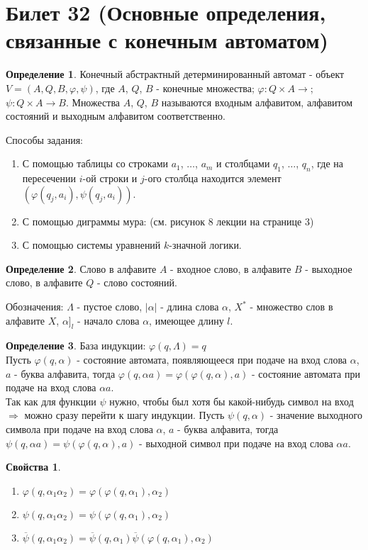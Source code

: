 \documentclass[a4paper, 12pt]{article}
\renewcommand{\phi}{\varphi}
\theoremstyle{definition}
\newtheorem*{definition}{Определение}
\theoremstyle{plain}
\newtheorem*{properties}{Свойства}
\theoremstyle{remark}
\begin{document}
  \section{Билет 32 (Основные определения, связанные с конечным автоматом)}
  \begin{definition}
    Конечный абстрактный детерминированный автомат - объект $V=(A,Q,B,\phi,\psi)$, где $A$, $Q$, $B$ - конечные множества; $\phi:Q\times A\rightarrow$; $\psi:Q\times A\rightarrow B$. Множества $A$, $Q$, $B$ называются входным алфавитом, алфавитом состояний и выходным алфавитом соответственно.
  \end{definition}
  Способы задания:\\
  \begin{enumerate}
    \item С помощью таблицы со строками $a_1$, $\ldots$, $a_m$ и столбцами $q_1$, $\ldots$, $q_n$, где на пересечении $i$-ой строки и $j$-ого столбца находится элемент $(\phi(q_j, a_i), \psi(q_j, a_i))$.
    \item С помощью диграммы мура: (см. рисунок 8 лекции на странице 3)
    \item С помощью системы уравнений $k$-значной логики.
  \end{enumerate}
  \begin{definition}
    Слово в алфавите $A$ - входное слово, в алфавите $B$ - выходное слово, в алфавите $Q$ - слово состояний.
  \end{definition}
  Обозначения: $\Lambda$ - пустое слово, $|\alpha|$ - длина слова $\alpha$, $X^*$ - множество слов в алфавите $X$, $\alpha]_l$ - начало слова $\alpha$, имеющее длину $l$.
  \begin{definition}
    База индукции: $\phi(q, \Lambda)=q$\\
    Пусть $\phi(q,\alpha)$ - состояние автомата, появляющееся при подаче на вход слова $\alpha$, $a$ - буква алфавита, тогда $\phi(q, \alpha a)=\phi(\phi(q,\alpha),a)$ - состояние автомата при подаче на вход слова $\alpha a$.\\
    Так как для функции $\psi$ нужно, чтобы был хотя бы какой-нибудь символ на вход $\Longrightarrow$ можно сразу перейти к шагу индукции.
    Пусть $\psi(q,\alpha)$ - значение выходного символа при подаче на вход слова $\alpha$, $a$ - буква алфавита, тогда $\psi(q,\alpha a)=\psi(\phi(q,\alpha),a)$ - выходной символ при подаче на вход слова $\alpha a$.
  \end{definition}
  \begin{properties}
    \begin{enumerate}
      \item $\phi(q,\alpha_1\alpha_2)=\phi(\phi(q,\alpha_1),\alpha_2)$
      \item $\psi(q,\alpha_1\alpha_2)=\psi(\phi(q,\alpha_1),\alpha_2)$
      \item $\overline{\psi}(q,\alpha_1\alpha_2)=\overline{\psi}(q,\alpha_1)\overline{\psi}(\phi(q,\alpha_1),\alpha_2)$
    \end{enumerate}
  \end{properties}
\end{document}
